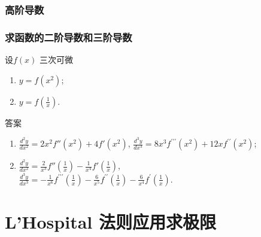 \documentclass[
10pt,
aspectratio=43,
]{beamer}
\begin{document}
\subsubsection{高阶导数}
\begin{frame}
	\frametitle{求函数的二阶导数和三阶导数}
	\everymath{\displaystyle}
	\begin{block}{设$f(x)$ 三次可微}
		\begin{enumerate}
			\item $y=f\left(x^2\right)$;
			\item $y=f\left(\frac{1}{x}\right)$.
		\end{enumerate}
	\end{block}

	\begin{exampleblock}{答案}
		\begin{enumerate}
			\pause
			\item $\frac{d^2y}{dx^2} = 2x^2f''\left(x^2\right) + 4f'\left(x^2\right)$,
			\pause
			      $\frac{d^3y}{dx^3}=8 x^3 f^{\prime \prime \prime}\left(x^2\right)+12 x f^{\prime \prime}\left(x^2\right)$;
				  \pause
			\item $\frac{d^2y}{dx^2} = \frac{2}{x^3}f''\left(\frac{1}{x}\right) - \frac{1}{x^4}f'\left(\frac{1}{x}\right)$,\\\pause
			      $\frac{d^3y}{dx^3}=-\frac{1}{x^6} f^{\prime \prime \prime}\left(\frac{1}{x}\right)-\frac{6}{x^5} f^{\prime \prime}\left(\frac{1}{x}\right)-\frac{6}{x^4} f^{\prime}\left(\frac{1}{x}\right)$.
		\end{enumerate}
	\end{exampleblock}
\end{frame}

\section{L'Hospital 法则应用求极限}
\end{document}
